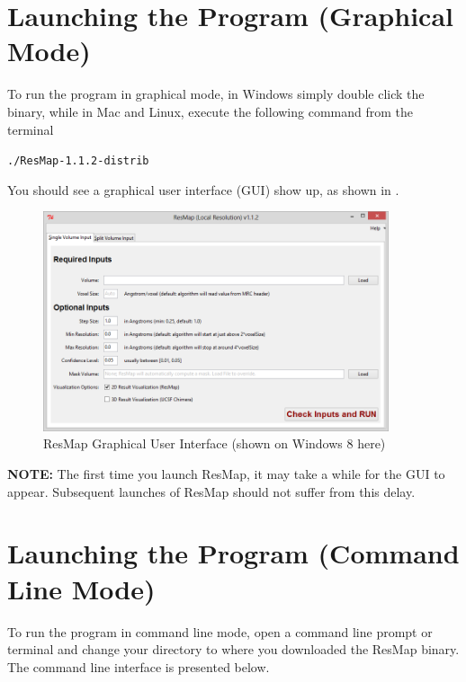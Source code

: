 \documentclass[10pt]{article}
\begin{document}
\section{Launching the Program (Graphical Mode)}
To run the program in graphical mode, in Windows simply double click the binary, while in Mac and Linux, execute the following command from the terminal
\begin{center}
	\textcolor{NavyBlue}{\texttt{./ResMap-1.1.2-distrib}}
\end{center}

You should see a graphical user interface (GUI) show up, as shown in .
\begin{figure}[!h]
\centering
\includegraphics[width=4in]{img/gui_singleVolume_112.png}
\caption{ResMap Graphical User Interface (shown on Windows 8 here)}
\label{fig:gui_singleVolume}
\end{figure}

\textcolor{RedOrange}{\textbf{NOTE:}} The first time you launch ResMap, it may take a while for the GUI to appear. Subsequent launches of ResMap should not suffer from this delay.

\section{Launching the Program (Command Line Mode)}
To run the program in command line mode, open a command line prompt or terminal and change your directory to where you downloaded the ResMap binary. The command line interface is presented below.

\medskip
\end{document}

